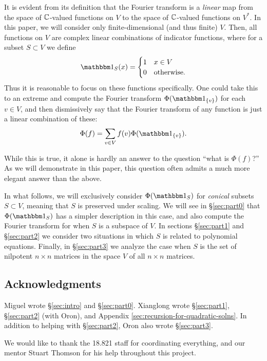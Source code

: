 It is evident from its definition that the Fourier transform is a \emph{linear} map from the space of $\mathbb{C}$-valued functions on $V$ to the space of $\mathbb{C}$-valued functions on $V^*$. In this paper, we will consider only finite-dimensional (and thus finite) $V$. Then, all functions on $V$ are complex linear combinations of indicator functions, where for a subset $S\subset V$ we define
\[ \IND_S(x) = \begin{cases}
1 & x \in V \\
0 & \text{otherwise.}     
\end{cases} \]
Thus it is reasonable to focus on these functions specifically. One could take this to an extreme and compute the Fourier transform $\Phi(\IND_{\{v\}})$ for each $v\in V$, and then dismissively say that the Fourier transform of any function is just a linear combination of these:
\[
	\Phi(f) = \sum_{v\in V} f(v)\Phi(\IND_{\{v\}}).
\]

While this is true, it alone is hardly an answer to the question ``what is $\Phi(f)$?'' As we will demonstrate in this paper, this question often admits a much more elegant answer than the above.


In what follows, we will exclusively consider $\Phi(\IND_S)$ for \emph{conical} subsets $S\subset V$, meaning that $S$ is preserved under scaling. We will see in \S\ref{sec:part0} that $\Phi(\IND_S)$ has a simpler description in this case, and also compute the Fourier transform for when $S$ is a subspace of $V$. In sections \S\ref{sec:part1} and \S\ref{sec:part2} we consider two situations in which $S$ is related to polynomial equations. Finally, in \S\ref{sec:part3} we analyze the case when $S$ is the set of nilpotent $n\times n$ matrices in the space $V$ of all $n\times n$ matrices.

\subsection*{Acknowledgments} Miguel wrote \S\ref{sec:intro} and \S\ref{sec:part0}. Xianglong wrote \S\ref{sec:part1}, \S\ref{sec:part2} (with Oron), and Appendix \ref{sec:recursion-for-quadratic-solns}. In addition to helping with \S\ref{sec:part2}, Oron also wrote \S\ref{sec:part3}.

We would like to thank the 18.821 staff for coordinating everything, and our mentor Stuart Thomson for his help throughout this project.